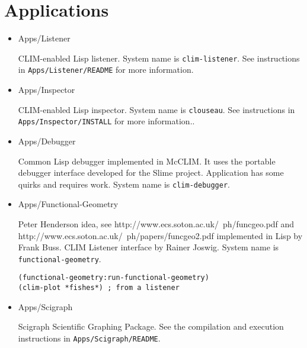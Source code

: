 \section{Applications}

\begin{itemize}
\item Apps/Listener

  CLIM-enabled Lisp listener. System name is
  \texttt{clim-listener}. See instructions in
  \texttt{Apps/Listener/README} for more information.

\item Apps/Inspector

  CLIM-enabled Lisp inspector. System name is \texttt{clouseau}. See
  instructions in \texttt{Apps/Inspector/INSTALL} for more
  information..

\item Apps/Debugger

  Common Lisp debugger implemented in McCLIM. It uses the portable
  debugger interface developed for the Slime project. Application has
  some quirks and requires work. System name is
  \texttt{clim-debugger}.

\item Apps/Functional-Geometry

  Peter Henderson idea, see http://www.ecs.soton.ac.uk/~ph/funcgeo.pdf
  and http://www.ecs.soton.ac.uk/~ph/papers/funcgeo2.pdf implemented
  in Lisp by Frank Buss. CLIM Listener interface by Rainer
  Joswig. System name is \texttt{functional-geometry}.

\begin{verbatim}
(functional-geometry:run-functional-geometry)
(clim-plot *fishes*) ; from a listener
\end{verbatim}

\item Apps/Scigraph

  Scigraph Scientific Graphing Package. See the compilation and
  execution instructions in \texttt{Apps/Scigraph/README}.
\end{itemize}

